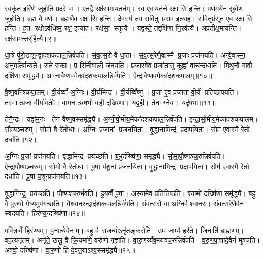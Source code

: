 स्वकृ॑त॒ इरि॑णे जुहोति प्रद॒रे वा। ए॒तद्वै रक्ष॑सामा॒यतन॑म्। स्व ए॒वायत॑ने॒ रक्षासि हन्ति। प॒र्ण॒मये॑न स्रु॒वेण॑ जुहोति। ब्रह्म॒ वै प॒र्णः। ब्रह्म॑णै॒व रक्षासि हन्ति। दे॒वस्य॑ त्वा सवि॒तुः प्र॑स॒व इत्या॑ह। स॒वि॒तृप्र॑सूत ए॒व रक्षासि हन्ति। ह॒त रक्षोऽव॑धिष्म॒ रक्ष॒ इत्या॑ह। रक्ष॑सा॒ स्तृत्यै। यद्वस्ते॒ तद्दक्षि॑णा नि॒रव॑त्यै। अप्र॑तीक्ष॒माय॑न्ति। रक्ष॑साम॒न्तर्‌हि॑त्यै॥९॥\anuvakamend[य॒च्छ॒ति॒ वरु॑ण॒न्तृती॑य॒व्विँजि॑त्या असृजत॒ समृ॑द्ध्यै हनो॒ मित्र॑द्रु॒गिति॑ हन्ति॒ स्तृत्यै॒ त्रीणि॑ च]

धा॒त्रे पु॑रो॒डाश॒न्द्वाद॑शकपाल॒न्निर्व॑पति। सं॒व॒त्स॒रो वै धा॒ता। सं॒व॒त्स॒रेणै॒वास्मै प्र॒जाः प्रज॑नयति। अन्वे॒वास्मा॒ अनु॑मतिर्मन्यते। रा॒ते रा॒का। प्र सि॑नीवा॒ली ज॑नयति। प्र॒जास्वे॒व प्रजा॑तासु कु॒ह्वा॑ वाच॑न्दधाति। मि॒थु॒नौ गावौ॒ दक्षि॑णा॒ समृ॑द्ध्यै। आ॒ग्ना॒वै॒ष्ण॒वमेका॑दशकपाल॒न्निर्व॑पति। ऐ॒न्द्रा॒वै॒ष्ण॒वमेका॑दशकपालम्॥१०॥

वै॒ष्ण॒वन्त्रि॑कपा॒लम्। वी॒र्य॑व्वाँ अ॒ग्निः। वी॒र्य॑मिन्द्र॑। वी॒र्य॑व्विँष्णु॑। प्र॒जा ए॒व प्रजा॑ता वी॒र्ये प्रति॑ष्ठापयति। तस्मात्प्र॒जा वी॒र्या॑वतीः। वा॒म॒न ऋ॑ष॒भो व॒ही दख्षि॑णा। यद्व॒ही। तेनाग्ने॒यः। यदृ॑ष॒भः॥११॥

तेनै॒न्द्रः। यद्वा॑म॒नः। तेन॑ वैष्ण॒वस्समृ॑द्ध्यै। अ॒ग्नी॒षो॒मीय॒मेका॑दशकपाल॒न्निर्व॑पति। इ॒न्द्रा॒सो॒मीय॒मेका॑दशकपालम्। सौ॒म्यञ्च॒रुम्। सोमो॒ वै रे॑तो॒धाः। अ॒ग्निः प्र॒जानां प्रजनयि॒ता। वृ॒द्धाना॒मिन्द्र॑ प्रदापयि॒ता। सोम॑ ए॒वास्मै॒ रेतो॒ दधा॑ति॥१२॥

अ॒ग्निः प्र॒जां प्रज॑नयति। वृ॒द्धामिन्द्र॒ प्रय॑च्छति। ब॒भ्रुर्दख्षि॑णा॒ समृ॑द्ध्यै। सो॒मा॒पौ॒ष्णञ्च॒रुन्निर्व॑पति। ऐ॒न्द्रा॒पौ॒ष्णञ्च॒रुम्। सोमो॒ वै रे॑तो॒धाः। पू॒षा प॑शू॒नां प्र॑जनयि॒ता। वृ॒द्धाना॒मिन्द्र॑ प्रदापयि॒ता। सोम॑ ए॒वास्मै॒ रेतो॒ दधा॑ति। पू॒षा प॒शून्प्रज॑नयति॥१३॥

वृ॒द्धानिन्द्र॒ प्रय॑च्छति। पौ॒ष्णश्च॒रुर्भ॑वति। इ॒यव्वैँ पू॒षा। अ॒स्यामे॒व प्रति॑तिष्ठति। श्या॒मो दख्षि॑णा॒ समृ॑द्ध्यै। ब॒हु वै पुरु॑षो मे॒ध्यमुप॑गच्छति। वै॒श्वा॒न॒रन्द्वाद॑शकपाल॒न्निर्व॑पति। सं॒व॒त्स॒रो वा अ॒ग्निर्वैश्वान॒रः। सं॒व॒त्स॒रेणै॒वैन स्वदयति। हिर॑ण्य॒न्दख्षि॑णा॥१४॥

प॒वित्र॒व्वैँ हिर॑ण्यम्। पु॒नात्ये॒वैनम्। ब॒हु वै रा॑ज॒न्योऽनृ॑तङ्करोति। उप॑ जा॒म्यै हर॑ते। जि॒नाति॑ ब्राह्म॒णम्। वद॒त्यनृ॑तम्। अनृ॑ते॒ खलु॒ वै क्रि॒यमा॑णे॒ वरु॑णो गृह्णाति। वा॒रु॒णय्यँ॑व॒मय॑ञ्च॒रुन्निर्व॑पति। व॒रु॒ण॒पा॒शादे॒वैनं॑ मुञ्चति। अश्वो॒ दख्षि॑णा। वा॒रु॒णो हि दे॒वत॒याऽश्व॒स्समृ॑द्ध्यै॥१५॥

